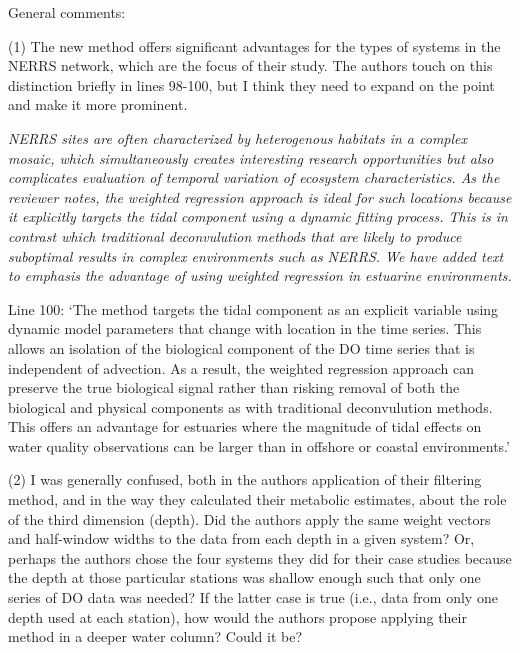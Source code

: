 \documentclass[letterpaper,12pt]{article}\usepackage[]{graphicx}\usepackage[]{color}
\begin{document}
General comments:

(1) The new method offers significant advantages for the types of systems in the NERRS network, which are the focus of their study. The authors touch on this distinction briefly in lines 98-100, but I think they need to expand on the point and make it more prominent.

{\it NERRS sites are often characterized by heterogenous habitats in a complex mosaic, which simultaneously creates interesting research opportunities but also complicates evaluation of temporal variation of ecosystem characteristics.  As the reviewer notes, the weighted regression approach is ideal for such locations because it explicitly targets the tidal component using a dynamic fitting process.  This is in contrast which traditional deconvulution methods that are likely to produce suboptimal results in complex environments such as NERRS.  We have added text to emphasis the advantage of using weighted regression in estuarine environments.

Line 100: `The method targets the tidal component as an explicit variable using dynamic model parameters that change with location in the time series.  This allows an isolation of the biological component of the DO time series that is independent of advection.  As a result, the weighted regression approach can preserve the true biological signal rather than risking removal of both the biological and physical components as with traditional deconvulution methods.  This offers an advantage for estuaries where the magnitude of tidal effects on water quality observations can be larger than in offshore or coastal environments.'
}

(2) I was generally confused, both in the authors application of their filtering method, and in the way they calculated their metabolic estimates, about the role of the third dimension (depth). Did the authors apply the same weight vectors and half-window widths to the data from each depth in a given system? Or, perhaps the authors chose the four systems they did for their case studies because the depth at those particular stations was shallow enough such that only one series of DO data was needed? If the latter case is true (i.e., data from only one depth used at each station), how would the authors propose applying their method in a deeper water column? Could it be? 
\end{document}
